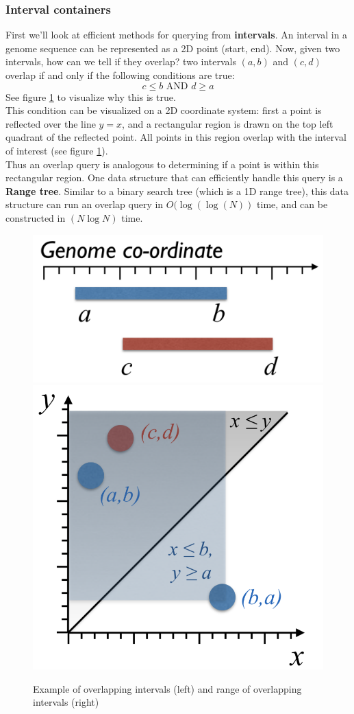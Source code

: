 \documentclass[12pt]{article}
\begin{document}
\subsubsection{Interval containers}
First we'll look at efficient methods for querying from \textbf{intervals}.
An interval in a genome sequence can be represented as a 2D point (start, end). Now, given two intervals, how can we tell if they overlap? two intervals $(a, b)$ and $(c, d)$ overlap if and only if the following conditions are true:
$$c \leq b\text{ AND }d\geq a$$
See figure \ref{fig:interval} to visualize why this is true.\\[10pt]
This condition can be visualized on a 2D coordinate system: first a point is reflected over the line $y=x$, and a rectangular region is drawn on the top left quadrant of the reflected point. All points in this region overlap with the interval of interest (see figure \ref{fig:interval}).\\[10pt]
Thus an overlap query is analogous to determining if a point is within this rectangular region. One data structure that can efficiently handle this query is a \textbf{Range tree}. Similar to a binary search tree (which is a 1D range tree), this data structure can run an overlap query in $O(\log(\log(N))$ time, and can be constructed in $(N\log N)$ time.
\begin{figure}[h]
    \centering
    \includegraphics[width=.45\linewidth]{interval.png}
    \includegraphics[width=.45\linewidth]{rtree.png}
    \caption{Example of overlapping intervals (left) and range of overlapping intervals (right)}
    \label{fig:interval}
\end{figure}\\
\end{document}
